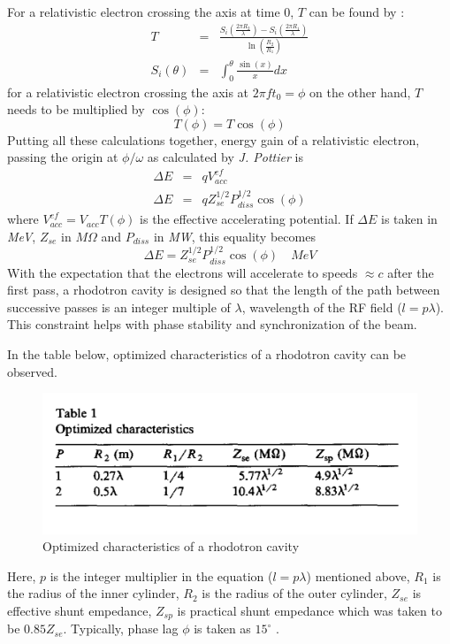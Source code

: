 \documentclass{article}
\begin{document}
For a relativistic electron crossing the axis at time 0, $T$ can be found by \cite{rhodo_pottier}:
\begin{eqnarray}
    T &=& \frac{S_i(\frac{2 \pi R_2}{\lambda}) - S_i(\frac{2 \pi R_1}{\lambda})}{\ln(\frac{R_2}{R_1})} \\
    S_i(\theta) &=& \int_0^{\theta} \frac{\sin(x)}{x} dx
\end{eqnarray}
for a relativistic electron crossing the axis at $2\pi f t_0 = \phi$ on the other hand, $T$ needs to be multiplied by $\cos(\phi)$:
\begin{equation}
    T(\phi) = T \cos(\phi)
\end{equation} 
Putting all these calculations together, energy gain of a relativistic electron, passing the origin at $\phi / \omega$ as calculated by \textit{J. Pottier} is \cite{rhodo_pottier}
\begin{eqnarray}
    \Delta E &=& q V_{acc}^{ef} \\
    \Delta E &=& q Z_{se}^{1/2}P_{diss}^{1/2} \cos(\phi)
\end{eqnarray}
where $ V_{acc}^{ef} = V_{acc} T(\phi)$ is the effective accelerating potential.
If $\Delta E$ is taken in \textit{MeV}, $Z_{se}$ in $M\Omega$ and $P_{diss}$ in \textit{MW}, this equality becomes
\begin{equation} \label{eq:W_gain_each_pass_pottier}
    \Delta E = Z_{se}^{1/2}P_{diss}^{1/2} \cos(\phi) \quad MeV
\end{equation}
With the expectation that the electrons will accelerate to speeds $\approx c$ after the first pass, a rhodotron cavity is designed so that the length of the path between successive passes is an integer multiple of $\lambda$, wavelength of the RF field ($l=p\lambda \label{eq:lpl}$).
This constraint helps with  phase stability and synchronization of the beam.

In the table below, optimized characteristics of a rhodotron cavity can be observed. 
\begin{figure}[H]
    \centering
    \includegraphics[width=.9\textwidth]{../../../figures/pottier_table1.png}
    \caption{Optimized characteristics of a rhodotron cavity \cite{rhodo_pottier}}
    \label{fig:pottier_table1}
\end{figure}
Here, $p$ is the integer multiplier in the equation ($l=p\lambda$) mentioned above, $R_1$ is the radius of the inner cylinder, $R_2$ is the radius of the outer cylinder, 
$Z_{se}$ is effective shunt empedance, $Z_{sp}$ is practical shunt empedance which was taken to be $0.85 Z_{se}$. Typically, phase lag $\phi$ is taken as $15^\circ$ \cite{rhodo_pottier}. 
\end{document}
